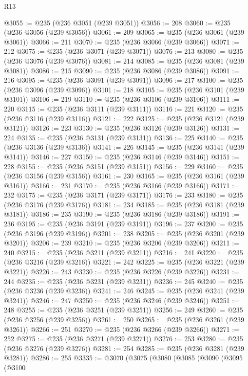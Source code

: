 \begin{lexlean}{R13}
\begin{coremodule}
@3055 := @235 (@236 @3051 (@239 @3051))
@3056 := 208
@3060 := @235 (@236 @3056 (@239 @3056))
@3061 := 209
@3065 := @235 (@236 @3061 (@239 @3061))
@3066 := 211
@3070 := @235 (@236 @3066 (@239 @3066))
@3071 := 212
@3075 := @235 (@236 @3071 (@239 @3071))
@3076 := 213
@3080 := @235 (@236 @3076 (@239 @3076))
@3081 := 214
@3085 := @235 (@236 @3081 (@239 @3081))
@3086 := 215
@3090 := @235 (@236 @3086 (@239 @3086))
@3091 := 216
@3095 := @235 (@236 @3091 (@239 @3091))
@3096 := 217
@3100 := @235 (@236 @3096 (@239 @3096))
@3101 := 218
@3105 := @235 (@236 @3101 (@239 @3101))
@3106 := 219
@3110 := @235 (@236 @3106 (@239 @3106))
@3111 := 220
@3115 := @235 (@236 @3111 (@239 @3111))
@3116 := 221
@3120 := @235 (@236 @3116 (@239 @3116))
@3121 := 222
@3125 := @235 (@236 @3121 (@239 @3121))
@3126 := 223
@3130 := @235 (@236 @3126 (@239 @3126))
@3131 := 224
@3135 := @235 (@236 @3131 (@239 @3131))
@3136 := 225
@3140 := @235 (@236 @3136 (@239 @3136))
@3141 := 226
@3145 := @235 (@236 @3141 (@239 @3141))
@3146 := 227
@3150 := @235 (@236 @3146 (@239 @3146))
@3151 := 228
@3155 := @235 (@236 @3151 (@239 @3151))
@3156 := 229
@3160 := @235 (@236 @3156 (@239 @3156))
@3161 := 230
@3165 := @235 (@236 @3161 (@239 @3161))
@3166 := 231
@3170 := @235 (@236 @3166 (@239 @3166))
@3171 := 232
@3175 := @235 (@236 @3171 (@239 @3171))
@3176 := 233
@3180 := @235 (@236 @3176 (@239 @3176))
@3181 := 234
@3185 := @235 (@236 @3181 (@239 @3181))
@3186 := 235
@3190 := @235 (@236 @3186 (@239 @3186))
@3191 := 236
@3195 := @235 (@236 @3191 (@239 @3191))
@3196 := 237
@3200 := @235 (@236 @3196 (@239 @3196))
@3201 := 238
@3205 := @235 (@236 @3201 (@239 @3201))
@3206 := 239
@3210 := @235 (@236 @3206 (@239 @3206))
@3211 := 240
@3215 := @235 (@236 @3211 (@239 @3211))
@3216 := 241
@3220 := @235 (@236 @3216 (@239 @3216))
@3221 := 242
@3225 := @235 (@236 @3221 (@239 @3221))
@3226 := 243
@3230 := @235 (@236 @3226 (@239 @3226))
@3231 := 244
@3235 := @235 (@236 @3231 (@239 @3231))
@3236 := 245
@3240 := @235 (@236 @3236 (@239 @3236))
@3241 := 246
@3245 := @235 (@236 @3241 (@239 @3241))
@3246 := 247
@3250 := @235 (@236 @3246 (@239 @3246))
@3251 := 248
@3255 := @235 (@236 @3251 (@239 @3251))
@3256 := 249
@3260 := @235 (@236 @3256 (@239 @3256))
@3261 := 250
@3265 := @235 (@236 @3261 (@239 @3261))
@3266 := 251
@3270 := @235 (@236 @3266 (@239 @3266))
@3271 := 252
@3275 := @235 (@236 @3271 (@239 @3271))
@3276 := 253
@3280 := @235 (@236 @3276 (@239 @3276))
@3281 := 254
@3285 := @235 (@236 @3281 (@239 @3281))
@3286 := 255
@3335 := @3070
    (@3075
      (@3080
        (@3085
          (@3090
            (@3095
              (@3100

\end{coremodule}
\end{lexlean}
